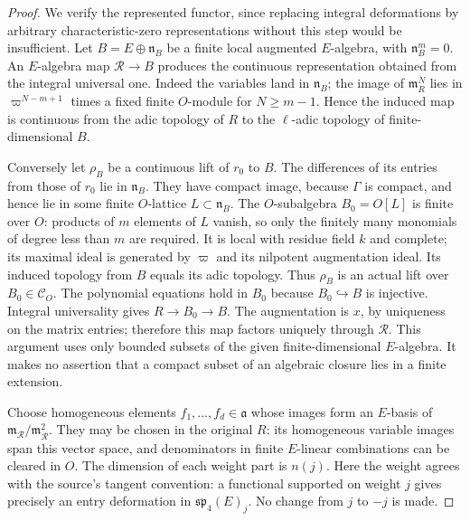 \begin{proof}
We verify the represented functor, since replacing integral
deformations by arbitrary characteristic-zero representations
without this step would be insufficient.
Let $B=E\oplus\mathfrak n_B$ be a finite local augmented
$E$-algebra, with $\mathfrak n_B^m=0$.
An $E$-algebra map $\mathcal R\to B$ produces the continuous
representation obtained from the integral universal one.
Indeed the variables land in $\mathfrak n_B$; the image of
$\mathfrak m_R^N$ lies in $\varpi^{N-m+1}$ times a fixed
finite $O$-module for $N\ge m-1$.  Hence the induced map is
continuous from the adic topology of $R$ to the
$\ell$-adic topology of finite-dimensional $B$.

Conversely let $\rho_B$ be a continuous lift of $r_0$ to $B$.
The differences of its entries from those of $r_0$ lie in
$\mathfrak n_B$.  They have compact image, because
$\Gamma$ is compact, and hence lie in some finite
$O$-lattice $L\subset\mathfrak n_B$.
The $O$-subalgebra $B_0=O[L]$ is finite over $O$:
products of $m$ elements of $L$ vanish, so only the finitely
many monomials of degree less than $m$ are required.
It is local with residue field $k$ and complete; its maximal
ideal is generated by $\varpi$ and its nilpotent augmentation
ideal.  Its induced topology from $B$ equals its adic topology.
Thus $\rho_B$ is an actual lift over $B_0\in\mathcal C_O$.
The polynomial equations hold in $B_0$ because $B_0\hookrightarrow B$
is injective.  Integral universality gives $R\to B_0\to B$.
The augmentation is $x$, by uniqueness on the matrix entries;
therefore this map factors uniquely through $\mathcal R$.
This argument uses only bounded subsets of the given
finite-dimensional $E$-algebra.  It makes no assertion that
a compact subset of an algebraic closure lies in a finite
extension.

Choose homogeneous elements $f_1,\ldots,f_d\in\mathfrak a$
whose images form an $E$-basis of
$\mathfrak m_{\mathcal R}/\mathfrak m_{\mathcal R}^2$.
They may be chosen in the original $R$: its homogeneous
variable images span this vector space, and denominators
in finite $E$-linear combinations can be cleared in $O$.
The dimension of each weight part is $n(j)$.
Here the weight agrees with the source's tangent convention:
a functional supported on weight $j$ gives precisely
an entry deformation in $\mathfrak{sp}_4(E)_j$.
No change from $j$ to $-j$ is made.


\end{proof}
